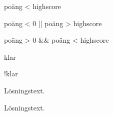 \Subtask  poäng < highscore

\Subtask poäng < 0 || poäng > highscore 

\Subtask  poäng > 0 \&\& poäng < highscore

\Subtask  klar

\Subtask  !klar




\ExtraTasks %

\Task 

\Subtask {}

\Subtask Lösningstext.


\AdvancedTasks %

\Task 

\Subtask {}

\Subtask Lösningstext.
